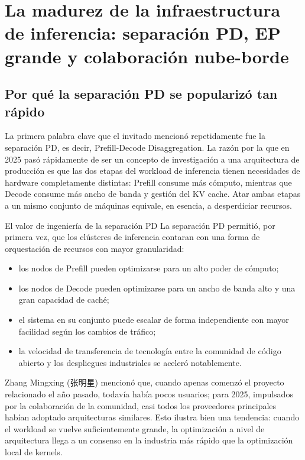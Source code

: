 \section{La madurez de la infraestructura de inferencia: separación PD, EP grande y colaboración nube-borde}

\subsection{Por qué la separación PD se popularizó tan rápido}
La primera palabra clave que el invitado mencionó repetidamente fue la separación PD, es decir, Prefill-Decode Disaggregation. La razón por la que en 2025 pasó rápidamente de ser un concepto de investigación a una arquitectura de producción es que las dos etapas del workload de inferencia tienen necesidades de hardware completamente distintas: Prefill consume más cómputo, mientras que Decode consume más ancho de banda y gestión del KV cache. Atar ambas etapas a un mismo conjunto de máquinas equivale, en esencia, a desperdiciar recursos.

\begin{importantbox}{El valor de ingeniería de la separación PD}
La separación PD permitió, por primera vez, que los clústeres de inferencia contaran con una forma de orquestación de recursos con mayor granularidad:
\begin{itemize}
  \item los nodos de Prefill pueden optimizarse para un alto poder de cómputo;
  \item los nodos de Decode pueden optimizarse para un ancho de banda alto y una gran capacidad de caché;
  \item el sistema en su conjunto puede escalar de forma independiente con mayor facilidad según los cambios de tráfico;
  \item la velocidad de transferencia de tecnología entre la comunidad de código abierto y los despliegues industriales se aceleró notablemente.
\end{itemize}
\end{importantbox}

Zhang Mingxing (张明星) mencionó que, cuando apenas comenzó el proyecto relacionado el año pasado, todavía había pocos usuarios; para 2025, impulsados por la colaboración de la comunidad, casi todos los proveedores principales habían adoptado arquitecturas similares. Esto ilustra bien una tendencia: cuando el workload se vuelve suficientemente grande, la optimización a nivel de arquitectura llega a un consenso en la industria más rápido que la optimización local de kernels.

